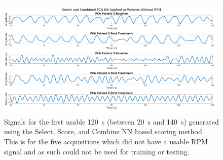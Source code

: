     \begin{figure}
        \centering
        
        \includegraphics[width=1.0\linewidth]{pca_signals.png}
        
        \captionsetup{singlelinecheck=false}
        \caption{Signals for the first usable \SI{120}{\second} (between \SI{20}{\second} and \SI{140}{\second}) generated using the Select, Score, and Combine \gls{NN} based scoring method. This is for the five acquisitions which did not have a usable \gls{RPM} signal and as such could not be used for training or testing.}
        \label{fig:pca_signals}
    \end{figure}
    
